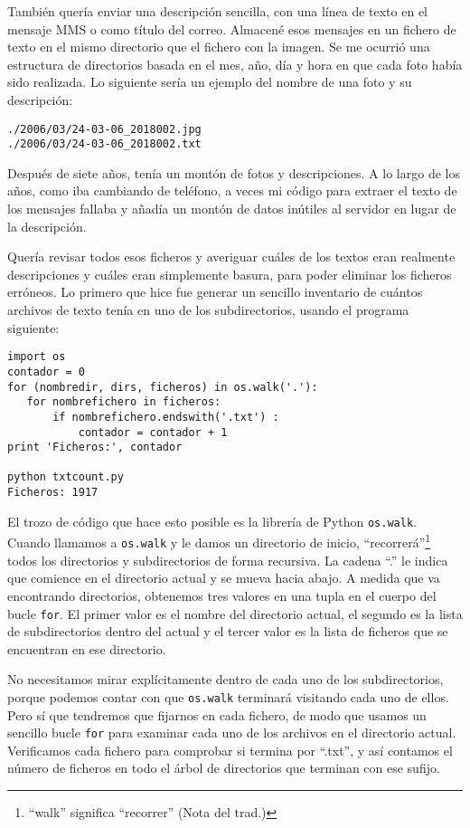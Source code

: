 También quería enviar una descripción sencilla, con una línea de texto en el mensaje MMS
o como título del correo. Almacené esos mensajes
en un fichero de texto en el mismo directorio que el fichero con la imagen.
Se me ocurrió una estructura de directorios basada en el mes, año, día y hora en
que cada foto había sido realizada. Lo siguiente sería un ejemplo del nombre
de una foto y su descripción:

\beforeverb
\begin{verbatim}
./2006/03/24-03-06_2018002.jpg
./2006/03/24-03-06_2018002.txt
\end{verbatim}
\afterverb
%
Después de siete años, tenía un montón de fotos y descripciones. A lo largo de los años,
como iba cambiando de teléfono, a veces mi código para extraer el texto de los mensajes
fallaba y añadía un montón de datos inútiles al servidor en lugar de la descripción.

Quería revisar todos esos ficheros y averiguar cuáles de los
textos eran realmente descripciones y cuáles eran simplemente basura, para poder eliminar
los ficheros erróneos. Lo primero que hice fue generar un sencillo inventario de
cuántos archivos de texto tenía en uno de los subdirectorios,
usando el programa siguiente:

\beforeverb
\begin{verbatim}
import os
contador = 0
for (nombredir, dirs, ficheros) in os.walk('.'):
   for nombrefichero in ficheros:
       if nombrefichero.endswith('.txt') :
           contador = contador + 1
print 'Ficheros:', contador

python txtcount.py
Ficheros: 1917
\end{verbatim}
\afterverb
%
El trozo de código que hace esto posible es la librería de Python
{\tt os.walk}. Cuando llamamos a {\tt os.walk} y le damos un directorio
de inicio, ``recorrerá''\footnote{``walk'' significa ``recorrer'' (Nota del trad.)}
todos los directorios y subdirectorios de forma recursiva. La cadena ``.'' le indica
que comience en el directorio actual y se mueva hacia abajo.
A medida que va encontrando directorios, obtenemos tres valores en una tupla
en el cuerpo del bucle {\tt for}. El primer valor es el nombre del
directorio actual, el segundo es la lista de subdirectorios dentro
del actual y el tercer valor es la lista de ficheros
que se encuentran en ese directorio.

No necesitamos mirar explícitamente dentro de cada uno de los subdirectorios,
porque podemos contar con que {\tt os.walk} terminará visitando cada
uno de ellos. Pero sí que tendremos que fijarnos en cada fichero, de
modo que usamos un sencillo bucle {\tt for} para examinar cada uno de los archivos
en el directorio actual. Verificamos cada fichero para comprobar si
termina por ``.txt'', y así contamos el número de
ficheros en todo el árbol de directorios que terminan con ese
sufijo.

